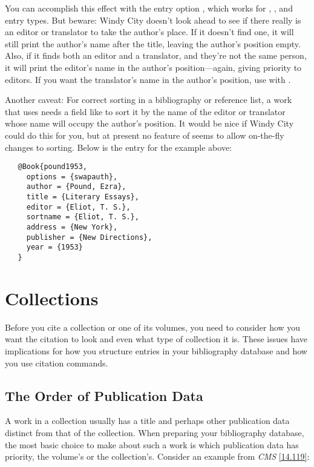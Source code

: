 \documentclass[11pt,letterpaper,oneside]{article}
\begin{document}
\noindent You can accomplish this effect with the entry option
, which works for , ,
and  entry types. But beware: Windy City doesn't look
ahead to see if there really is an editor or translator to take the
author's place. If it doesn't find one, it will still print the
author's name after the title, leaving the author's position empty.
Also, if it finds both an editor and a translator, and they're not the
same person, it will print the editor's name in the author's
position---again, giving priority to editors. If you want the
translator's name in the author's position, use  with
.

Another caveat: For correct sorting in a bibliography or reference
list, a work that uses  needs a field like
 to sort it by the name of the editor or translator
whose name will occupy the author's position. It would be nice if
Windy City could do this for you, but at present no feature of
\biblatex seems to allow on-the-fly changes to sorting. Below
is the entry for the example above:

\begin{verbatim}
   @Book{pound1953,
     options = {swapauth},
     author = {Pound, Ezra},
     title = {Literary Essays},
     editor = {Eliot, T. S.},
     sortname = {Eliot, T. S.},
     address = {New York},
     publisher = {New Directions},
     year = {1953}
   }
\end{verbatim}

\section{Collections}

Before you cite a collection or one of its volumes, you need to
consider how you want the citation to look and even what type of
collection it is. These issues have implications for how you structure
entries in your bibliography database and how you use citation
commands.

\subsection{The Order of Publication Data}
\label{collorder}

A work in a collection usually has a title and perhaps other
publication data distinct from that of the collection. When preparing
your bibliography database, the most basic choice to make about such a
work is which publication data has priority, the volume's or the
collection's. Consider an example from \textit{CMS} \ref{14.119}:
\end{document}
